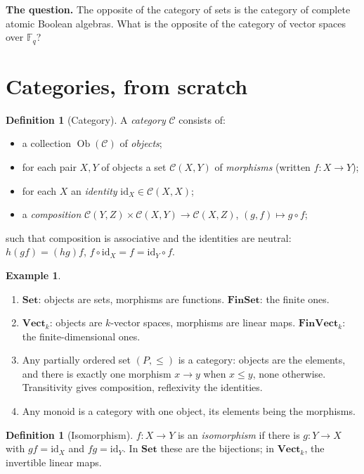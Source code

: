 \documentclass[11pt,a4paper]{article}
\theoremstyle{definition}
\newtheorem{definition}[theorem]{Definition}
\newtheorem{example}[theorem]{Example}
\theoremstyle{remark}
\newcommand{\FF}{\mathbb{F}}
\newcommand{\cat}[1]{\mathbf{#1}}
\newcommand{\Set}{\cat{Set}}
\newcommand{\FinSet}{\cat{FinSet}}
\newcommand{\Vect}{\cat{Vect}}
\newcommand{\FinVect}{\cat{FinVect}}
\DeclareMathOperator{\Ob}{Ob}
\begin{document}
\medskip
\noindent\textbf{The question.} The opposite of the category of sets is the category of
complete atomic Boolean algebras. What is the opposite of the category of vector spaces over
$\FF_q$?

\section{Categories, from scratch}\label{sec:cats}

\begin{definition}[Category]
A \emph{category} $\mathcal{C}$ consists of:
\begin{itemize}[nosep]
  \item a collection $\Ob(\mathcal{C})$ of \emph{objects};
  \item for each pair $X, Y$ of objects a set $\mathcal{C}(X,Y)$ of \emph{morphisms}
        (written $f : X \to Y$);
  \item for each $X$ an \emph{identity} $\mathrm{id}_X \in \mathcal{C}(X,X)$;
  \item a \emph{composition} $\mathcal{C}(Y,Z) \times \mathcal{C}(X,Y) \to \mathcal{C}(X,Z)$,
        $(g,f) \mapsto g \circ f$;
\end{itemize}
such that composition is associative and the identities are neutral:
$h(gf) = (hg)f$, $f \circ \mathrm{id}_X = f = \mathrm{id}_Y \circ f$.
\end{definition}

\begin{example}\label{ex:cats}
\begin{enumerate}[nosep,label=(\alph*)]
  \item $\Set$: objects are sets, morphisms are functions. $\FinSet$: the finite ones.
  \item $\Vect_k$: objects are $k$-vector spaces, morphisms are linear maps.
        $\FinVect_k$: the finite-dimensional ones.
  \item Any partially ordered set $(P,\leq)$ is a category: objects are the elements, and
        there is exactly one morphism $x \to y$ when $x \leq y$, none otherwise.
        Transitivity gives composition, reflexivity the identities.
  \item Any monoid is a category with one object, its elements being the morphisms.
\end{enumerate}
\end{example}

\begin{definition}[Isomorphism]
$f : X \to Y$ is an \emph{isomorphism} if there is $g : Y \to X$ with $gf = \mathrm{id}_X$
and $fg = \mathrm{id}_Y$. In $\Set$ these are the bijections; in $\Vect_k$, the invertible
linear maps.
\end{definition}
\end{document}
